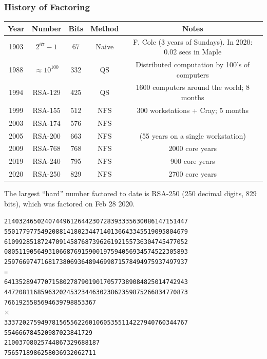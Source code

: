 \documentclass[12pt,titlepage]{article}
\begin{document}
\subsubsection{History of Factoring}
\begin{center}
	\begin{tabular}{|c|c|c|c|c|}
		\hline
		Year & Number & Bits & Method & Notes\\
		\hline
		1903 & $2^{67} - 1$ & 67 & Naive & F. Cole (3 years of Sundays). In 2020: 0.02 secs in Maple\\
		\hline
		1988 & $\approx 10^{100}$ & 332 & QS & Distributed computation by 100’s of computers\\
		\hline
		1994 & RSA-129 & 425 & QS & 1600 computers around the world; 8 months\\
		\hline
		1999 & RSA-155 & 512 & NFS & 300 workstations + Cray; 5 months\\
		\hline
		2003 & RSA-174 & 576 & NFS & \\
		\hline
		2005 & RSA-200 & 663 & NFS & (55 years on a single workstation)\\
		\hline
		2009 & RSA-768 & 768 & NFS & 2000 core years\\
		\hline
		2019 & RSA-240 & 795 & NFS & 900 core years\\
		\hline
		2020 & RSA-250 & 829 & NFS & 2700 core years\\
		\hline
	\end{tabular}
\end{center}

The largest ``hard'' number factored to date is RSA-250 (250 decimal digits, 829 bits), which was factored on Feb 28 2020.

\texttt{21403246502407449612644230728393335630086147151447\\55017797754920881418023447140136643345519095804679\\61099285187247091458768739626192155736304745477052\\08051190564931066876915900197594056934574522305893\\25976697471681738069364894699871578494975937497937\\ = \\64135289477071580278790190170577389084825014742943\\44720811685963202453234463023862359875266834770873\\7661925585694639798853367\\$\times$\\33372027594978156556226010605355114227940760344767\\554666784520987023841729\\21003708025744867329688187\\7565718986258036932062711}
\end{document}
